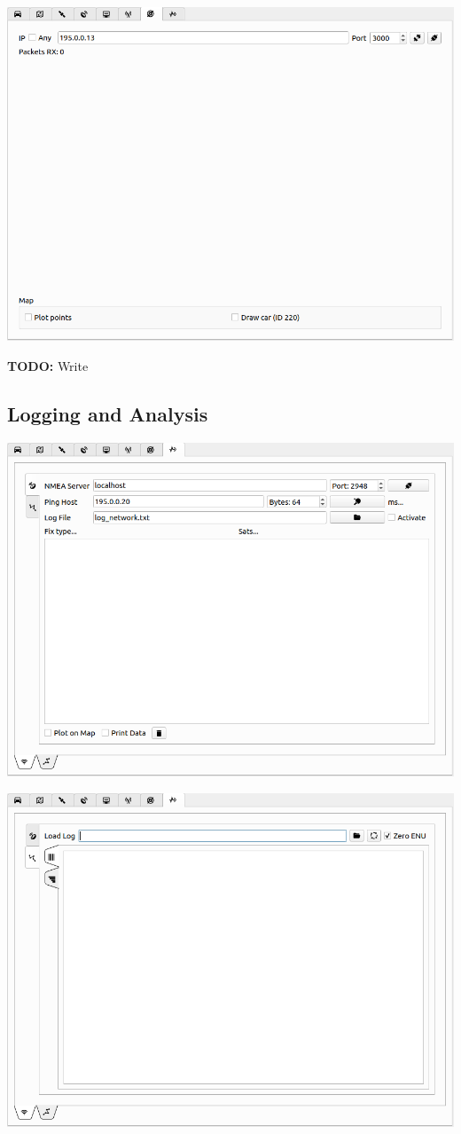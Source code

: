 \documentclass[12pt]{article} %
\newcommand{\todo}[1]{{\color{red} \textbf{TODO:} #1}}
\begin{document}
\noindent \includegraphics[width=\textwidth]{./screens/ncom_client.png}

\todo{Write}

\subsection{Logging and Analysis}

\noindent \includegraphics[width=\textwidth]{./screens/Log1.png}

\noindent \includegraphics[width=\textwidth]{./screens/Log2.png}
\end{document}
